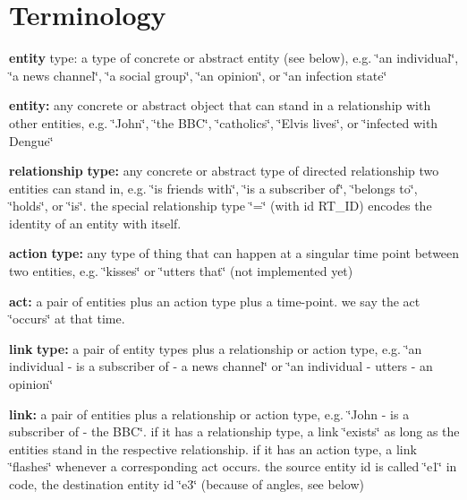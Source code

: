 \section*{Terminology }


\begin{DoxyItemize}
\item {\bfseries entity} type\+: a type of concrete or abstract entity (see below), e.\+g. \char`\"{}an individual\char`\"{}, \char`\"{}a news channel\char`\"{}, \char`\"{}a social group\char`\"{}, \char`\"{}an opinion\char`\"{}, or \char`\"{}an infection state\char`\"{}
\item {\bfseries entity\+:} any concrete or abstract object that can stand in a relationship with other entities, e.\+g. \char`\"{}\+John\char`\"{}, \char`\"{}the B\+B\+C\char`\"{}, \char`\"{}catholics\char`\"{}, \char`\"{}\+Elvis lives\char`\"{}, or \char`\"{}infected with Dengue\char`\"{}
\item {\bfseries relationship} {\bfseries type\+:} any concrete or abstract type of directed relationship two entities can stand in, e.\+g. \char`\"{}is friends with\char`\"{}, \char`\"{}is a subscriber of\char`\"{}, \char`\"{}belongs to\char`\"{}, \char`\"{}holds\char`\"{}, or \char`\"{}is\char`\"{}. the special relationship type \char`\"{}=\char`\"{} (with id R\+T\+\_\+\+ID) encodes the identity of an entity with itself.
\item {\bfseries action} {\bfseries type\+:} any type of thing that can happen at a singular time point between two entities, e.\+g. \char`\"{}kisses\char`\"{} or \char`\"{}utters that\char`\"{} (not implemented yet)
\item {\bfseries act\+:} a pair of entities plus an action type plus a time-\/point. we say the act \char`\"{}occurs\char`\"{} at that time.
\item {\bfseries link} {\bfseries type\+:} a pair of entity types plus a relationship or action type, e.\+g. \char`\"{}an individual -\/ is a subscriber of -\/ a news channel\char`\"{} or \char`\"{}an individual -\/ utters -\/ an opinion\char`\"{}
\item {\bfseries link\+:} a pair of entities plus a relationship or action type, e.\+g. \char`\"{}\+John -\/ is a subscriber of -\/ the B\+B\+C\char`\"{}. if it has a relationship type, a link \char`\"{}exists\char`\"{} as long as the entities stand in the respective relationship. if it has an action type, a link \char`\"{}flashes\char`\"{} whenever a corresponding act occurs. the source entity id is called \char`\"{}e1\char`\"{} in code, the destination entity id \char`\"{}e3\char`\"{} (because of angles, see below)

\end{DoxyItemize}
